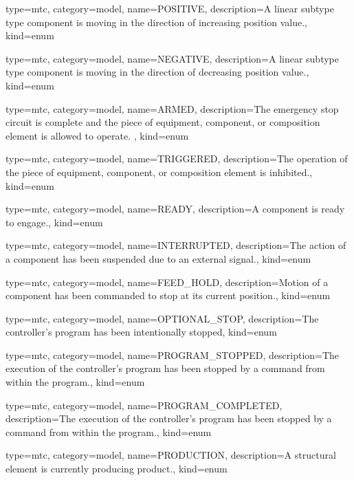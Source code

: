 {
  type=mtc,
  category=model,
  name={POSITIVE},
  description={A \gls{linear subtype} type component is moving in the direction of increasing position value.},
  kind={enum}
}


{
  type=mtc,
  category=model,
  name={NEGATIVE},
  description={A \gls{linear subtype} type component is moving in the direction of decreasing position value.},
  kind={enum}
}


{
  type=mtc,
  category=model,
  name={ARMED},
  description={The emergency stop circuit is complete and the piece of equipment, component, or composition element is allowed to operate. },
  kind={enum}
}


{
  type=mtc,
  category=model,
  name={TRIGGERED},
  description={The operation of the piece of equipment, component, or composition element is inhibited.},
  kind={enum}
}


{
  type=mtc,
  category=model,
  name={READY},
  description={A component is ready to engage.},
  kind={enum}
}


{
  type=mtc,
  category=model,
  name={INTERRUPTED},
  description={The action of a \gls{component} has been suspended due to an external signal.},
  kind={enum}
}


{
  type=mtc,
  category=model,
  name={FEED\_HOLD},
  description={Motion of a \gls{component} has been commanded to stop at its current position.},
  kind={enum}
}


{
  type=mtc,
  category=model,
  name={OPTIONAL\_STOP},
  description={The controller’s program has been intentionally stopped},
  kind={enum}
}


{
  type=mtc,
  category=model,
  name={PROGRAM\_STOPPED},
  description={The execution of the \gls{controller}'s program has been stopped by a command from within the program.},
  kind={enum}
}


{
  type=mtc,
  category=model,
  name={PROGRAM\_COMPLETED},
  description={The execution of the controller’s program has been stopped by a command from within the program.},
  kind={enum}
}


{
  type=mtc,
  category=model,
  name={PRODUCTION},
  description={A \gls{structural element} is currently producing product.},
  kind={enum}
}


